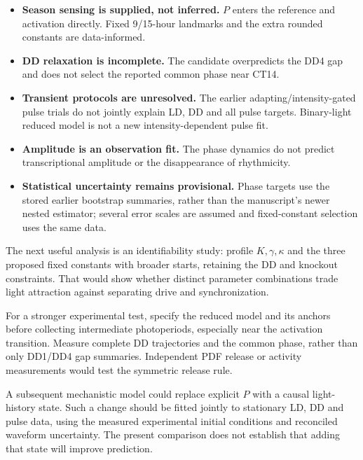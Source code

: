 \documentclass[11pt,letterpaper]{article}
\begin{document}
\begin{tcolorbox}[colback=orange!4,colframe=orange!50!black,boxrule=0.5pt,
 title=Remaining limits]
\begin{itemize}
\item \textbf{Season sensing is supplied, not inferred.}
$P$ enters the reference and activation directly. Fixed 9/15-hour
landmarks and the extra rounded constants are data-informed.
\item \textbf{DD relaxation is incomplete.}
The candidate overpredicts the DD4 gap and does not select the
reported common phase near CT14.
\item \textbf{Transient protocols are unresolved.}
The earlier adapting/intensity-gated pulse trials do not jointly
explain LD, DD and all pulse targets. Binary-light reduced model is not a new
intensity-dependent pulse fit.
\item \textbf{Amplitude is an observation fit.}
The phase dynamics do not predict transcriptional amplitude or
the disappearance of rhythmicity.
\item \textbf{Statistical uncertainty remains provisional.}
Phase targets use the stored earlier bootstrap summaries, rather
than the manuscript's newer nested estimator; several error scales
are assumed and fixed-constant selection uses the same data.
\end{itemize}
\end{tcolorbox}

The next useful analysis is an identifiability study: profile
$K,\gamma,\kappa$ and the three proposed fixed constants with broader
starts, retaining the DD and knockout constraints. That would show
whether distinct parameter combinations trade light attraction against
separating drive and synchronization.

For a stronger experimental test, specify the reduced model and its
anchors before collecting intermediate photoperiods, especially near
the activation transition. Measure complete DD trajectories and the
common phase, rather than only DD1/DD4 gap summaries. Independent PDF
release or activity measurements would test the symmetric release rule.

A subsequent mechanistic model could replace explicit $P$ with a causal
light-history state. Such a change should be fitted jointly to stationary
LD, DD and pulse data, using the measured experimental initial conditions
and reconciled waveform uncertainty. The present comparison does not
establish that adding that state will improve prediction.
\end{document}
